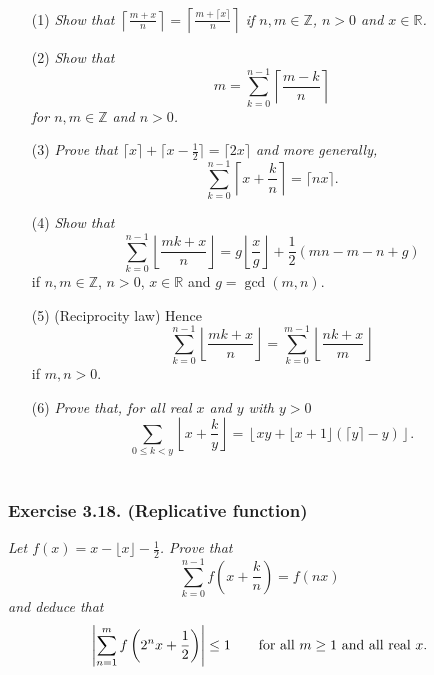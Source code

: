 \documentclass{article}
\begin{document}
\begin{enumerate}
\item[(1)]
  \emph{Show that $\left\lceil \frac{m + x}{n} \right\rceil
  = \left\lceil \frac{m + \lceil x \rceil}{n} \right\rceil$
  if $n, m \in \mathbb{Z}$, $n > 0$ and $x \in \mathbb{R}$.}

\item[(2)]
  \emph{Show that
  \[
    m = \sum_{k=0}^{n-1} \left\lceil \frac{m - k}{n} \right\rceil
  \]
  for $n, m \in \mathbb{Z}$ and $n > 0$.}

\item[(3)]
  \emph{Prove that $\lceil x \rceil + \lceil x-\frac{1}{2} \rceil = \lceil 2x \rceil$
  and more generally,}
  \[
    \sum_{k=0}^{n-1} \left\lceil x + \frac{k}{n} \right\rceil
    = \lceil nx \rceil.
  \]

\item[(4)]
  \emph{Show that}
  \[
    \sum_{k=0}^{n-1} \left\lfloor \frac{mk + x}{n} \right\rfloor
    = g \left\lfloor \frac{x}{g} \right\rfloor + \frac{1}{2}(mn - m - n + g)
  \]
  if $n, m \in \mathbb{Z}$, $n > 0$, $x \in \mathbb{R}$ and $g = \gcd(m,n)$.

\item[(5)]
  (Reciprocity law) Hence
  \[
    \sum_{k=0}^{n-1} \left\lfloor \frac{mk + x}{n} \right\rfloor
    = \sum_{k=0}^{m-1} \left\lfloor \frac{nk + x}{m} \right\rfloor
  \]
  if $m, n > 0$.

\item[(6)]
  \emph{Prove that, for all real $x$ and $y$ with $y > 0$}
  \[
    \sum_{0 \leq k < y} \left\lfloor x + \frac{k}{y} \right\rfloor
    = \left\lfloor xy + \lfloor x+1 \rfloor(\lceil y \rceil - y) \right\rfloor.
  \] \\
\end{enumerate}






\subsubsection*{Exercise 3.18. (Replicative function)}
\emph{Let $f(x) = x - \lfloor x \rfloor - \frac{1}{2}$.
Prove that
\[
  \sum_{k=0}^{n-1} f\left( x+\frac{k}{n} \right) = f(nx)
\]
and deduce that}
\[
  \abs{ \sum_{n=1}^{m} f\left( 2^n x + \frac{1}{2} \right) } \leq 1
  \qquad
  \text{for all $m \geq 1$ and all real $x$}.
\] \\
\end{document}

